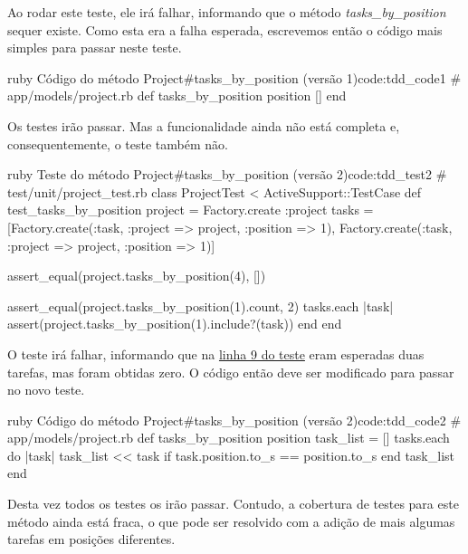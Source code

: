 Ao rodar este teste, ele irá falhar, informando que o método \textit{tasks\_by\_position} sequer existe. Como esta era a falha esperada, escrevemos então o código mais simples para passar neste teste.

\begin{mycode}{ruby}%
{Código do método Project\#tasks\_by\_position (versão 1)}{code:tdd_code1}
# app/models/project.rb
def tasks_by_position position
  []
end
\end{mycode}

Os testes irão passar. Mas a funcionalidade ainda não está completa e, consequentemente, o teste também não.

\begin{mycode}{ruby}%
{Teste do método Project\#tasks\_by\_position (versão 2)}{code:tdd_test2}
# test/unit/project_test.rb
class ProjectTest < ActiveSupport::TestCase
  def test_tasks_by_position
    project = Factory.create :project
    tasks = [Factory.create(:task, :project => project, :position => 1),
             Factory.create(:task, :project => project, :position => 1)]

    assert_equal(project.tasks_by_position(4), [])

    assert_equal(project.tasks_by_position(1).count, 2)
    tasks.each { |task| assert(project.tasks_by_position(1).include?(task)) }
  end
end
\end{mycode}

O teste irá falhar, informando que na \hyperref[code:tdd_test1]{linha 9 do teste} eram esperadas duas tarefas, mas foram obtidas zero. O código então deve ser modificado para passar no novo teste.

\begin{mycode}{ruby}%
{Código do método Project\#tasks\_by\_position (versão 2)}{code:tdd_code2}
# app/models/project.rb
def tasks_by_position position
  task_list = []
  tasks.each do |task|
    task_list << task if task.position.to_s == position.to_s
  end
  task_list
end
\end{mycode}

Desta vez todos os testes os irão passar. Contudo, a cobertura de testes para este método ainda está fraca, o que pode ser resolvido com a adição de mais algumas tarefas em posições diferentes.

